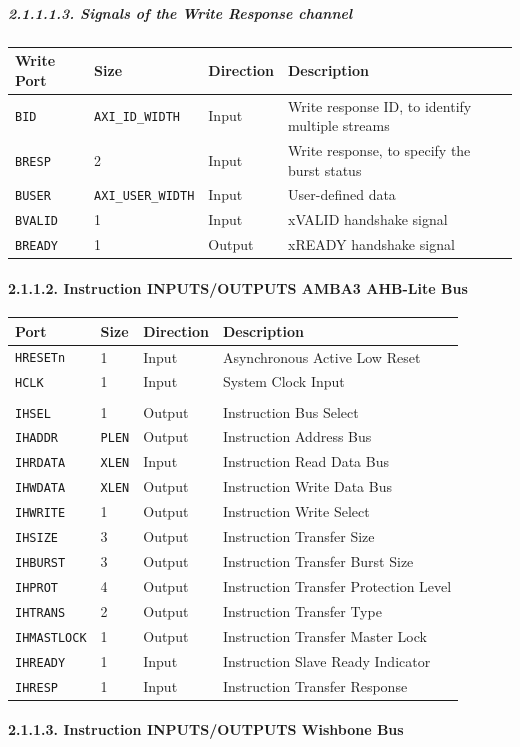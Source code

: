 \documentclass[]{article}
\let\oldparagraph\paragraph
\renewcommand{\paragraph}[1]{\oldparagraph{#1}\mbox{}}
\let\oldsubparagraph\subparagraph
\renewcommand{\subparagraph}[1]{\oldsubparagraph{#1}\mbox{}}
\begin{document}
\subparagraph{2.1.1.1.3. Signals of the Write Response
channel}\label{signals-of-the-write-response-channel}

\begin{longtable}[]{@{}llll@{}}
\toprule
Write Port & Size & Direction & Description\tabularnewline
\midrule
\endhead
\texttt{BID} & \texttt{AXI\_ID\_WIDTH} & Input & Write response ID, to
identify multiple streams\tabularnewline
\texttt{BRESP} & 2 & Input & Write response, to specify the burst
status\tabularnewline
\texttt{BUSER} & \texttt{AXI\_USER\_WIDTH} & Input & User-defined
data\tabularnewline
\texttt{BVALID} & 1 & Input & xVALID handshake signal\tabularnewline
\texttt{BREADY} & 1 & Output & xREADY handshake signal\tabularnewline
\bottomrule
\end{longtable}

\paragraph{2.1.1.2. Instruction INPUTS/OUTPUTS AMBA3 AHB-Lite
Bus}\label{instruction-inputsoutputs-amba3-ahb-lite-bus}

\begin{longtable}[]{@{}llll@{}}
\toprule
Port & Size & Direction & Description\tabularnewline
\midrule
\endhead
\texttt{HRESETn} & 1 & Input & Asynchronous Active Low
Reset\tabularnewline
\texttt{HCLK} & 1 & Input & System Clock Input\tabularnewline
& & &\tabularnewline
\texttt{IHSEL} & 1 & Output & Instruction Bus Select\tabularnewline
\texttt{IHADDR} & \texttt{PLEN} & Output & Instruction Address
Bus\tabularnewline
\texttt{IHRDATA} & \texttt{XLEN} & Input & Instruction Read Data
Bus\tabularnewline
\texttt{IHWDATA} & \texttt{XLEN} & Output & Instruction Write Data
Bus\tabularnewline
\texttt{IHWRITE} & 1 & Output & Instruction Write Select\tabularnewline
\texttt{IHSIZE} & 3 & Output & Instruction Transfer Size\tabularnewline
\texttt{IHBURST} & 3 & Output & Instruction Transfer Burst
Size\tabularnewline
\texttt{IHPROT} & 4 & Output & Instruction Transfer Protection
Level\tabularnewline
\texttt{IHTRANS} & 2 & Output & Instruction Transfer Type\tabularnewline
\texttt{IHMASTLOCK} & 1 & Output & Instruction Transfer Master
Lock\tabularnewline
\texttt{IHREADY} & 1 & Input & Instruction Slave Ready
Indicator\tabularnewline
\texttt{IHRESP} & 1 & Input & Instruction Transfer
Response\tabularnewline
\bottomrule
\end{longtable}

\paragraph{2.1.1.3. Instruction INPUTS/OUTPUTS Wishbone
Bus}\label{instruction-inputsoutputs-wishbone-bus}
\end{document}
